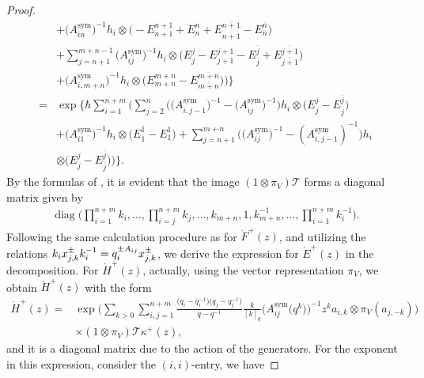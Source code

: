 \documentclass[10pt,a4paper]{amsart}
\numberwithin{equation}{section}
\begin{document}
\begin{proof}
\begin{align*}
&+
\bigl(A_{in}^{\operatorname{sym}}\bigr)^{-1}h_i\otimes\bigl(-E^{n+1}_{n+1}+E^{n}_{n}+E^{\overline{n+1}}_{\overline{n+1}}-E^{\overline{n}}_{\overline{n}}\bigr)\\
&+\sum\limits_{j=n+1}^{m+n-1}
\bigl(A_{ij}^{\operatorname{sym}}\bigr)^{-1}h_i\otimes\bigl(E^{j}_{j}-E^{j+1}_{j+1}-E^{\overline{j}}_{\overline{j}}+E^{\overline{j+1}}_{\overline{j+1}}\bigr)\\
&+\bigl(A_{i,m+n}^{\operatorname{sym}}\bigr)^{-1}h_i\otimes\bigl(E^{m+n}_{m+n}-E^{\overline{m+n}}_{\overline{m+n}}\bigr)
\Bigr)\Bigr\}\\
={}&\exp\Biggl\{\hbar\sum\limits_{i=1}^{n+m}\Biggl(\sum\limits_{j=2}^{n}\bigl(\bigl(A_{i,j-1}^{\operatorname{sym}}\bigr)^{-1}-\bigl(A_{ij}^{\operatorname{sym}}\bigr)^{-1}\bigr)h_i\otimes \bigl(E^{j}_{j}-E^{\overline{j}}_{\overline{j}}\bigr)\\
&+\bigl(A_{i1}^{\operatorname{sym}}\bigr)^{-1}h_i\otimes \bigl(E^{\overline{1}}_{\overline{1}}-E^{1}_{1}\bigr)+\sum\limits_{j=n+1}^{m+n}
\bigl(\bigl(A_{ij}^{\operatorname{sym}}\bigr)^{-1}-(A_{i,j-1}^{\operatorname{sym}})^{-1}\bigr)h_i\\
&\otimes \bigl(E^{j}_{j}-E^{\overline{j}}_{\overline{j}}\bigr)\Bigr)\Bigr\}.
\end{align*}
By the formulas of , it is evident that the image $(1\otimes\pi_V)\mathcal{T}$ forms a diagonal matrix given by
\begin{gather}\label{T12}
 \operatorname{diag}\Biggl(\prod\limits_{i=1}^{n+m}k_i, \dots, \prod\limits_{i=j}^{n+m}k_j, \dots, k_{m+n},1, k_{m+n}^{-1}, \dots, \prod\limits_{i=1}^{n+m}k_i^{-1}\Biggr).
\end{gather}
Following the same calculation procedure as for $\dot{F}^+(z)$, and utilizing the relations $\smash{k_ix_{j,k}^{\pm}k_i^{-1}}=\smash{q_i^{\pm A_{ij}}x_{j,k}^{\pm}}$, we derive the expression for $\dot{E}^+(z)$ in the decomposition.
For $\dot{H}^+(z)$, actually, using the vector representation $\pi_V$, we obtain $\dot{H}^+(z)$ with the form
\begin{align*}
 \dot{H}^+(z)={}&\exp\Biggl(\sum\limits_{k>0}\sum\limits_{i,j=1}^{n+m}\frac{\bigl(q_i-q_i^{-1}\bigr)\bigl(q_j-q_j^{-1}\bigr)}{q-q^{-1}}
 \frac{k}{[k]_q}\bigl(A_{ij}^{\operatorname{sym}}\bigl(q^k\bigr)\bigr)^{-1} z^k
 a_{i,k}\otimes\pi_V(a_{j,-k})\Biggr)\\
 &\times(1\otimes\pi_V)\mathcal{T}\kappa^{+}(z),
\end{align*}
and it is a diagonal matrix due to the action of the generators. For the exponent in this expression, consider the $(i,i)$-entry, we have

\end{proof}
\end{document}
